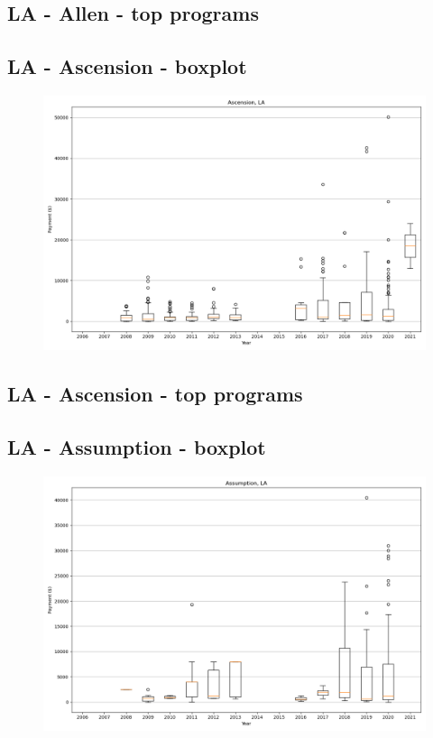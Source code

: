 \subsection*{LA - Allen - top programs}

\newpage
\subsection*{LA - Ascension - boxplot}
\begin{figure}[h]
\centering
\includegraphics[width=7in]{../output/boxplots/counties/Ascension-LA_boxplot.png}
\end{figure}


\subsection*{LA - Ascension - top programs}

\newpage
\subsection*{LA - Assumption - boxplot}
\begin{figure}[h]
\centering
\includegraphics[width=7in]{../output/boxplots/counties/Assumption-LA_boxplot.png}
\end{figure}


